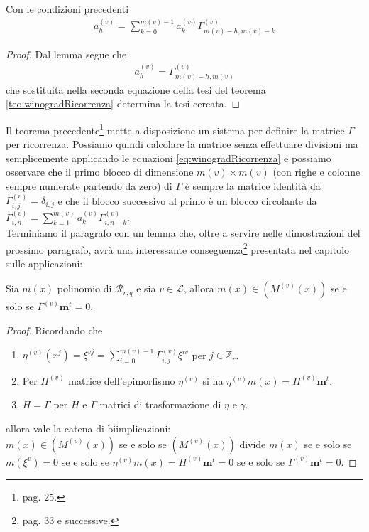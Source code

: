 \begin{corollario}
   Con le condizioni precedenti
   \begin{align}
      a_{h}^{(v)} = \sum_{k=0}^{m(v)-1} a_{k}^{(v)} \Gamma_{m(v) - h, m(v) - k}^{(v)}
   \end{align}
\end{corollario}
\begin{proof}
   Dal lemma segue che
   \begin{align*}
      a_{h}^{(v)} = \Gamma_{m(v) - h, m(v)}^{(v)}
   \end{align*}
   che sostituita nella seconda equazione della tesi del teorema \ref{teo:winogradRicorrenza} determina la tesi cercata.
\end{proof}
\noindent
Il teorema precedente\footnote{\cite{cerruti} pag. 25.} mette a disposizione un sistema per definire la matrice $\Gamma$ per ricorrenza. Possiamo quindi calcolare la matrice senza effettuare divisioni ma semplicemente applicando le equazioni \ref{eq:winogradRicorrenza} e possiamo osservare che il primo blocco di dimensione $m(v) \times m(v)$ (con righe e colonne sempre numerate partendo da zero) di $\Gamma$ è sempre la matrice identità da $\Gamma_{i,j}^{(v)} = \delta_{i,j}$ e che il blocco successivo al primo è un blocco circolante da $\Gamma_{i,n}^{(v)} = \sum_{k=1}^{m(v)} a_{k}^{(v)} \Gamma_{i,n-k}^{(v)} $. \\
Terminiamo il paragrafo con un lemma che, oltre a servire nelle dimostrazioni del prossimo paragrafo, avrà una interessante conseguenza\footnote{\cite{cerruti} pag. 33 e successive.} presentata nel capitolo sulle applicazioni:
\begin{lemmax} \label{le:codiciEdGamma}
   Sia $m(x)$ polinomio di $\mathcal{R}_{r,q}$ e sia $v \in \mathscr{L}$, allora $m(x) \in (M^{(v)}(x))$ se e solo se $\Gamma^{(v)} \mathbf{m}^{t} = 0$.
\end{lemmax}
\begin{proof}
   Ricordando che
   \begin{enumerate}
      \item $\eta^{(v)}(x^{j}) = \xi^{vj} = \sum_{i=0}^{m(v)-1}\Gamma_{i,j}^{(v)}\xi^{iv}$ per $j \in \mathbb{Z}_{r}$.
      \item Per $H^{(v)}$ matrice dell'epimorfismo $\eta^{(v)}$ si ha $\eta^{(v)}m(x) = H^{(v)}\mathbf{m}^{t}$.
      \item $H=\Gamma$ per $H$ e $\Gamma$ matrici di trasformazione di $\eta$ e $\gamma$.
   \end{enumerate}
   allora vale la catena di biimplicazioni:\\
   $m(x)\in (M^{(v)}(x))$ se e solo se $(M^{(v)}(x))$ divide $m(x)$ se e solo se $m(\xi^{v}) = 0$ se e solo se $\eta^{(v)}m(x) = H^{(v)}\mathbf{m}^{t} = 0$ se e solo se $ \Gamma^{(v)}\mathbf{m}^{t} = 0$.
\end{proof}

